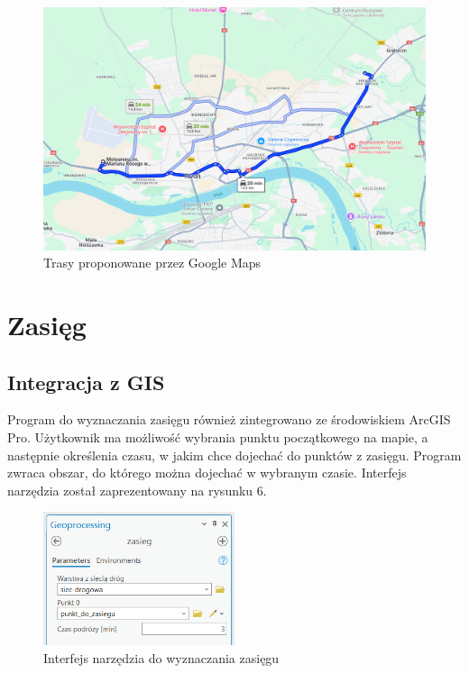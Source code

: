 \documentclass{article}
\begin{document}
\begin{figure}[H]
    \centering
    \includegraphics[width=1\textwidth]{img/motoarena-rod-google.png}
    \caption{Trasy proponowane przez Google Maps}
\end{figure}

\section{Zasięg}
\subsection{Integracja z GIS}
Program do wyznaczania zasięgu również zintegrowano ze środowiskiem ArcGIS Pro. Użytkownik ma możliwość wybrania punktu początkowego na mapie, a następnie określenia czasu, w jakim chce dojechać do punktów z zasięgu. Program zwraca obszar, do którego można dojechać w wybranym czasie. Interfejs narzędzia został zaprezentowany na rysunku 6.

\begin{figure}[H]
    \centering
    \includegraphics[width=0.5\textwidth]{img/narzedzie-interfejs-zasieg.png}
    \caption{ Interfejs narzędzia do wyznaczania zasięgu}
\end{figure}
\end{document}
